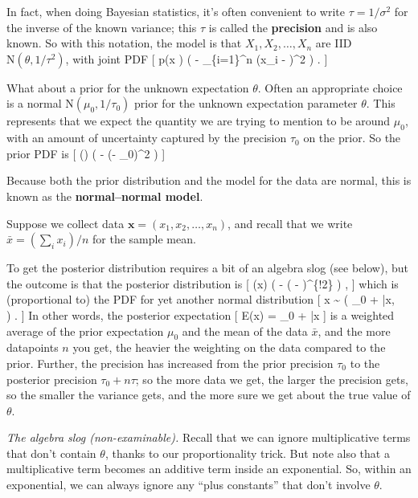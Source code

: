 \documentclass[
  letterpaper,
  DIV=11,
  numbers=noendperiod]{scrreprt}
\theoremstyle{remark}
\begin{document}
In fact, when doing Bayesian statistics, it's often convenient to write
\(\tau = 1/\sigma^2\) for the inverse of the known variance; this
\(\tau\) is called the \textbf{precision} and is also known. So with
this notation, the model is that \(X_1, X_2, \dots, X_n\) are IID
\(\text{N}(\theta, 1 / \tau^2)\), with joint PDF {[} p(\mathbf x
\mid \theta) \propto \exp \left( -  \sum\_\{i=1\}\^{}n
(x\_i - \theta)\^{}2 \right) . {]}

What about a prior for the unknown expectation \(\theta\). Often an
appropriate choice is a normal \(\text{N}(\mu_0, 1/\tau_0)\) prior for
the unknown expectation parameter \(\theta\). This represents that we
expect the quantity we are trying to mention to be around \(\mu_0\),
with an amount of uncertainty captured by the precision \(\tau_0\) on
the prior. So the prior PDF is {[} \pi(\theta) \propto \exp \left( -
 (\theta - \mu\_0)\^{}2 \right) {]}

Because both the prior distribution and the model for the data are
normal, this is known as the \textbf{normal--normal model}.

Suppose we collect data \(\mathbf x = (x_1, x_2, \dots, x_n)\), and
recall that we write \(\bar x = (\sum_i x_i)/n\) for the sample mean.

To get the posterior distribution requires a bit of an algebra slog (see
below), but the outcome is that the posterior distribution is {[}
\pi(\theta \mid \mathbf x) \propto \exp \left( -
 \left( \theta -
 \right)\^{}\{!2\}
\right) , {]} which is (proportional to) the PDF for yet another normal
distribution {[} \theta \mid \mathbf x \sim {} \left(
 \mu\_0 + 
\bar x, ~ \right) . {]} In other words, the
posterior expectation {[} \mathbb E(\theta \mid \mathbf x) =
 \mu\_0 + 
\bar x {]} is a weighted average of the prior expectation \(\mu_0\) and
the mean of the data \(\bar x\), and the more datapoints \(n\) you get,
the heavier the weighting on the data compared to the prior. Further,
the precision has increased from the prior precision \(\tau_0\) to the
posterior precision \(\tau_0 + n\tau\); so the more data we get, the
larger the precision gets, so the smaller the variance gets, and the
more sure we get about the true value of \(\theta\).

\emph{The algebra slog (non-examinable).} Recall that we can ignore
multiplicative terms that don't contain \(\theta\), thanks to our
proportionality trick. But note also that a multiplicative term becomes
an additive term inside an exponential. So, within an exponential, we
can always ignore any ``plus constants'' that don't involve \(\theta\).
\end{document}
